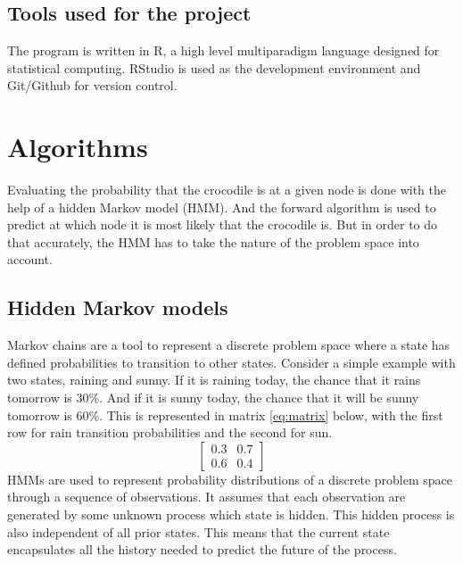 \documentclass[12pt, a4paper]{article}
\begin{document}
\subsection{Tools used for the project}

The program is written in R, a high level multiparadigm language designed for statistical computing. RStudio is used as the development environment and Git/Github for version control. 

\section{Algorithms}

Evaluating the probability that the crocodile is at a given node is done with the help of a hidden Markov model (HMM). And the forward algorithm is used to predict at which node it is most likely that the crocodile is. But in order to do that accurately, the HMM has to take the nature of the problem space into account.

\subsection{Hidden Markov models}

Markov chains are a tool to represent a discrete problem space where a state has defined probabilities to transition to other states. Consider a simple example with two states, raining and sunny. If it is raining today, the chance that it rains tomorrow is 30\%. And if it is sunny today, the chance that it will be sunny tomorrow is 60\%. This is represented in matrix \ref{eq:matrix} below, with the first row for rain transition probabilities and the second for sun.
\begin{equation}\label{eq:matrix}
\begin{bmatrix}
       0.3 & 0.7\\
       0.6 & 0.4
\end{bmatrix}
\end{equation}
HMMs are used to represent probability distributions of a discrete problem space through a sequence of observations. It assumes that each observation are generated by some unknown process which state is hidden. This hidden process is also independent of all prior states. This means that the current state encapsulates all the history needed to predict the future of the process. 
\end{document}
